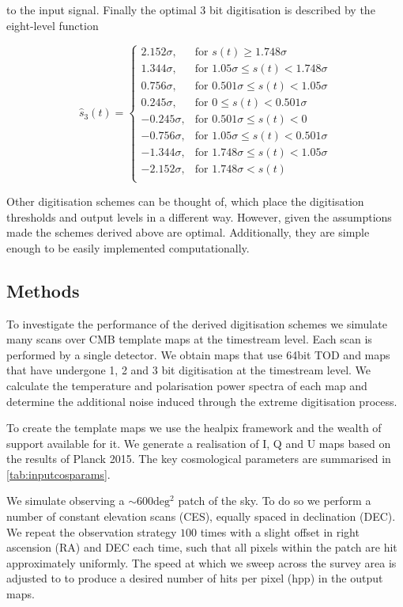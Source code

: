 \documentclass[apj]{emulateapj}
\begin{document}
to the input signal. Finally the optimal 3 bit digitisation is described by the eight-level function

\[ \hat{s}_3(t) = \left\{ \begin{array}{rl}
2.152 \sigma, & \text{for } s(t) \geq 1.748 \sigma\\
1.344 \sigma, & \text{for } 1.05 \sigma \leq s(t) < 1.748 \sigma\\
0.756 \sigma, & \text{for } 0.501 \sigma \leq s(t) < 1.05 \sigma\\
0.245 \sigma, & \text{for } 0 \leq s(t) < 0.501 \sigma\\
-0.245 \sigma, & \text{for } 0.501 \sigma \leq s(t) < 0\\
-0.756 \sigma, & \text{for } 1.05 \sigma \leq s(t) < 0.501 \sigma\\
-1.344 \sigma, & \text{for } 1.748 \sigma \leq s(t) < 1.05 \sigma\\
-2.152 \sigma, & \text{for } 1.748 \sigma < s(t)\\
\end{array} \right. \]

Other digitisation schemes can be thought of, which place the digitisation thresholds and output levels in a different way. However, given the assumptions made the schemes derived above are optimal. Additionally, they are simple enough to be easily implemented computationally.

\subsection{Methods}
\label{subsec:method}

To investigate the performance of the derived digitisation schemes we simulate many scans over CMB template maps at the timestream level. Each scan is performed by a single detector. We obtain maps that use 64bit TOD and maps that have undergone 1, 2 and 3 bit digitisation at the timestream level. We calculate the temperature and polarisation power spectra of each map and determine the additional noise induced through the extreme digitisation process.

To create the template maps we use the healpix framework and the wealth of support available for it. We generate a realisation of I, Q and U maps based on the results of Planck 2015. The key cosmological parameters are summarised in \ref{tab:inputcosparams}.

We simulate observing a $\sim 600 \mathrm{deg^2}$ patch of the sky. To do so we perform a number of constant elevation scans (CES), equally spaced in declination (DEC). We repeat the observation strategy $100$ times with a slight offset in right ascension (RA) and DEC each time, such that all pixels within the patch are hit approximately uniformly. The speed at which we sweep across the survey area is adjusted to to produce a desired number of hits per pixel (hpp) in the output maps.
\end{document}

